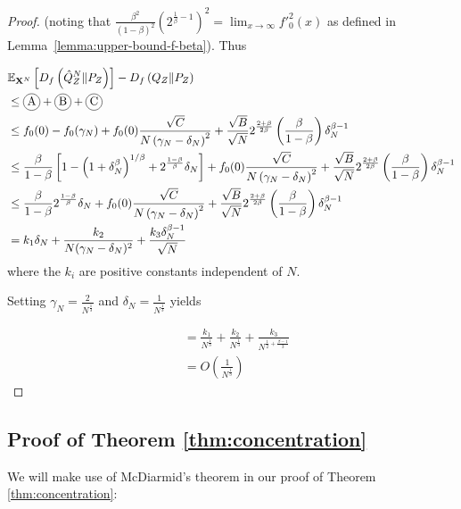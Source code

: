 \begin{proof}
(noting that $\frac{\beta^2}{(1-\beta)^2}\left(2^{\frac{1}{\beta} - 1}\right)^2 = \lim_{x\to\infty} f'^2_0(x)$ as defined in Lemma~\ref{lemma:upper-bound-f-beta}). Thus

\begin{align*}
    &\E_{\XN} \left[ D_f\left( \hat{Q}_Z^N \| P_Z\right)\right] - D_f\left( Q_{Z} \| P_Z\right)\\
    &\leq \encircle{A} + \encircle{B} + \encircle{C} \\
    &\leq f_0(0) - f_0(\gamma_N) + f_0(0) \frac{\sqrt{C}}{N \left( \gamma_N - \delta_N \right)^2} + \frac{\sqrt{B}}{\sqrt{N}}2^{\frac{2+\beta}{2\beta}}\left(\frac{\beta}{1-\beta}\right) \delta_N^{\beta - 1}\\
    &\leq \frac{\beta}{1-\beta}\left[1 - \left(1+\delta_N^\beta\right)^{1/\beta} + 2^{\frac{1-\beta}{\beta}}\delta_N\right] + f_0(0) \frac{\sqrt{C}}{N \left( \gamma_N - \delta_N \right)^2} + \frac{\sqrt{B}}{\sqrt{N}}2^{\frac{2+\beta}{2\beta}}\left(\frac{\beta}{1-\beta}\right) \delta_N^{\beta - 1}\\
    &\leq \frac{\beta}{1-\beta} 2^{\frac{1-\beta}{\beta}}\delta_N + f_0(0) \frac{\sqrt{C}}{N \left( \gamma_N - \delta_N \right)^2}  + \frac{\sqrt{B}}{\sqrt{N}}2^{\frac{2+\beta}{2\beta}}\left(\frac{\beta}{1-\beta}\right) \delta_N^{\beta - 1}\\
    &= k_1 \delta_N + \frac{k_2}{N(\gamma_N - \delta_N)^2} + \frac{k_3\delta_N^{\beta-1}}{\sqrt{N}}
\end{align*}
where the $k_i$ are positive constants independent of $N$.

Setting $\gamma_N = \frac{2}{N^\frac{1}{3}}$ and $\delta_N = \frac{1}{N^\frac{1}{3}}$ yields

\begin{align*}
    &= \frac{k_1}{N^{\frac{1}{3}}}
    + \frac{k_2}{N^{\frac{1}{3}}} 
    + \frac{k_3}{N^{\frac{1}{2}+\frac{\beta-1}{3}}} \\
    &= O\left(\frac{1}{N^\frac{1}{3}}\right)
\end{align*}

\end{proof}

\subsection{Proof of Theorem \ref{thm:concentration}}\label{proof:thm3}

We will make use of McDiarmid's theorem in our proof of Theorem \ref{thm:concentration}:

